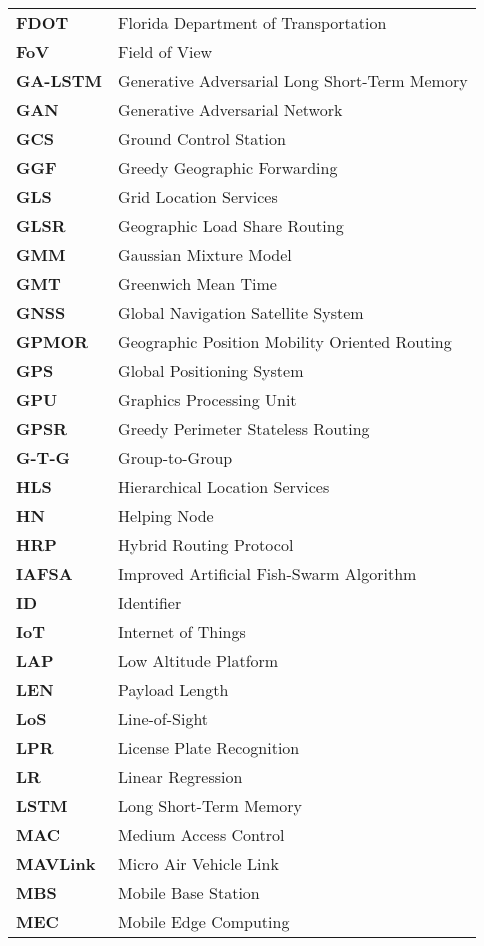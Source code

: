 \begin{longtable}{p{4cm} p{11cm}}
\textbf{FDOT} & Florida Department of Transportation \\
\textbf{FoV} & Field of View \\
\textbf{GA-LSTM} & Generative Adversarial Long Short-Term Memory \\
\textbf{GAN} & Generative Adversarial Network \\
\textbf{GCS} & Ground Control Station \\
\textbf{GGF} & Greedy Geographic Forwarding \\
\textbf{GLS} & Grid Location Services \\
\textbf{GLSR} & Geographic Load Share Routing \\
\textbf{GMM} & Gaussian Mixture Model \\
\textbf{GMT} & Greenwich Mean Time \\
\textbf{GNSS} & Global Navigation Satellite System \\
\textbf{GPMOR} & Geographic Position Mobility Oriented Routing \\
\textbf{GPS} & Global Positioning System \\
\textbf{GPU} & Graphics Processing Unit \\
\textbf{GPSR} & Greedy Perimeter Stateless Routing \\
\textbf{G-T-G} & Group-to-Group \\
\textbf{HLS} & Hierarchical Location Services \\
\textbf{HN} & Helping Node \\
\textbf{HRP} & Hybrid Routing Protocol \\
\textbf{IAFSA} & Improved Artificial Fish-Swarm Algorithm \\
\textbf{ID} & Identifier \\
\textbf{IoT} & Internet of Things \\
\textbf{LAP} & Low Altitude Platform \\
\textbf{LEN} & Payload Length \\
\textbf{LoS} & Line-of-Sight \\
\textbf{LPR} & License Plate Recognition \\
\textbf{LR} & Linear Regression \\
\textbf{LSTM} & Long Short-Term Memory \\
\textbf{MAC} & Medium Access Control \\
\textbf{MAVLink} & Micro Air Vehicle Link \\
\textbf{MBS} & Mobile Base Station \\
\textbf{MEC} & Mobile Edge Computing \\

\end{longtable}
